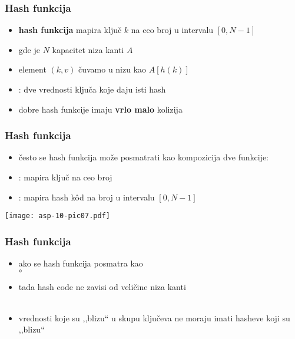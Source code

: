 \documentclass[compress]{beamer}
\begin{document}
\begin{frame}[fragile]
  \frametitle{Hash funkcija}
  \begin{itemize}
    \item \textbf{hash funkcija} mapira ključ $k$ na ceo broj u intervalu $[0,N-1]$
    \item gde je $N$ kapacitet niza kanti $A$
    \item element $(k,v)$ čuvamo u nizu kao $A[h(k)]$
    \item {}: dve vrednosti ključa koje daju isti hash
    \item dobre hash funkcije imaju \textbf{vrlo malo} kolizija
  \end{itemize}
\end{frame}

\begin{frame}[fragile]
  \frametitle{Hash funkcija}
  \begin{itemize}
    \item često se hash funkcija može posmatrati kao kompozicija dve funkcije:
    \item {}: mapira ključ na ceo broj
    \item {}: mapira hash kôd na broj u intervalu $[0,N-1]$ 
  \end{itemize}
  \begin{center}
    \texttt{[image: asp-10-pic07.pdf]}
  \end{center}
\end{frame}

\begin{frame}[fragile]
  \frametitle{Hash funkcija}
  \begin{itemize}
    \item ako se hash funkcija posmatra kao \\  $\circ$ 
    \item tada hash code ne zavisi od veličine niza kanti \\ \ \\
    \item vrednosti koje su ,,blizu`` u skupu ključeva ne moraju imati hasheve koji su ,,blizu`` 
  \end{itemize}
\end{frame}
\end{document}
